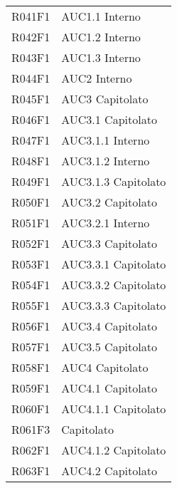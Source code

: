 \documentclass[../analisi-dei-requisiti.tex]{subfiles}
\begin{document}
\begin{longtable}[H]{>{\centering}m{5cm} >{\centering}m{5cm}}
  R041F1                               & AUC1.1 Interno                \\
  R042F1                               & AUC1.2 Interno                \\
  R043F1                               & AUC1.3 Interno                \\
  R044F1                               & AUC2 Interno                  \\
  R045F1                               & AUC3 Capitolato               \\
  R046F1                               & AUC3.1 Capitolato             \\
  R047F1                               & AUC3.1.1 Interno              \\
  R048F1                               & AUC3.1.2 Interno              \\
  R049F1                               & AUC3.1.3 Capitolato           \\
  R050F1                               & AUC3.2 Capitolato             \\
  R051F1                               & AUC3.2.1 Interno              \\
  R052F1                               & AUC3.3 Capitolato             \\
  R053F1                               & AUC3.3.1 Capitolato           \\
  R054F1                               & AUC3.3.2 Capitolato           \\
  R055F1                               & AUC3.3.3 Capitolato           \\
  R056F1                               & AUC3.4 Capitolato             \\
  R057F1                               & AUC3.5 Capitolato             \\
  R058F1                               & AUC4 Capitolato               \\
  R059F1                               & AUC4.1 Capitolato             \\
  R060F1                               & AUC4.1.1 Capitolato           \\
  R061F3                               & Capitolato                    \\
  R062F1                               & AUC4.1.2 Capitolato           \\
  R063F1                               & AUC4.2 Capitolato             \\

\end{longtable}
\end{document}
